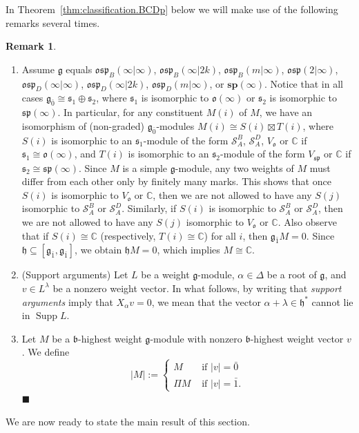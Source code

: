 \documentclass[12pt]{amsart}
\newcommand\C{\mathbb{C}}
\newcommand\g{\mathfrak{g}}
\newcommand\fs{\mathfrak{s}}
\newcommand\fh{\mathfrak{h}}
\newcommand\fb{\mathfrak{b}}
\newcommand\fsp{\mathfrak{sp}}
\newcommand\fosp{\mathfrak{osp}}
\newcommand\fo{\mathfrak{o}}
\newcommand\D{\Delta}
\newcommand\cS{\mathcal{S}}
\newcommand\bsp{\mathbf{sp}}
\DeclareMathOperator{\Supp}{Supp} %
\theoremstyle{plain}
\theoremstyle{definition}
\newtheorem{rem}[theo]{Remark}
\numberwithin{equation}{section}
\newcommand\xqed[1]{%
  \leavevmode\unskip\penalty9999 \hbox{}\nobreak\hfill
  \quad\hbox{#1}}
\newcommand\demo{\xqed{$\blacksquare$}}
\begin{document}
In Theorem~\ref{thm:classification.BCDp} below we will make use of the following remarks several times.

\begin{rem}\label{rem:supp.arguments}
\begin{enumerate}
\item Assume $\g$ equals $\fosp_B(\infty|\infty)$, $\fosp_B(\infty|2k)$, $\fosp_B(m|\infty)$, $\fosp(2|\infty)$, $\fosp_D(\infty|\infty)$, $\fosp_D(\infty|2k)$, $\fosp_D(m|\infty)$, or $\bsp(\infty)$. Notice that in all cases $\g_{\bar 0}\cong \fs_1\oplus \fs_2$, where $\fs_1$ is isomorphic to $\fo(\infty)$ or $\fs_2$ is isomorphic to $\fsp(\infty)$. In particular, for any constituent $M(i)$ of $M$, we have an isomorphism of (non-graded) $\g_{\bar 0}$-modules $M(i)\cong S(i)\boxtimes T(i)$, where $S(i)$ is isomorphic to an $\fs_1$-module of the form $\cS_A^B$, $\cS_A^D$, $V_\fo$ or $\C$ if $\fs_1\cong \fo(\infty)$, and $T(i)$ is isomorphic to an $\fs_2$-module of the form $V_\fsp$ or $\C$ if $\fs_2\cong \fsp(\infty)$. Since $M$ is a simple $\g$-module, any two weights of $M$ must differ from each other only by finitely many marks. This shows that once $S(i)$ is isomorphic to $V_\fo$ or $\C$, then we are not allowed to have any $S(j)$ isomorphic to $\cS_A^B$ or $\cS_A^D$. Similarly, if $S(i)$ is isomorphic to $\cS_A^B$ or $\cS_A^D$, then we are not allowed to have any $S(j)$ isomorphic to $V_\fo$ or $\C$. Also observe that if $S(i)\cong \C$ (respectively, $T(i)\cong \C$) for all $i$, then $\g_{\bar 1}M=0$. Since $\fh\subseteq [\g_{\bar 1}, \g_{\bar 1}]$, we obtain $\fh M=0$, which implies $M\cong \C$.
\item (Support arguments) Let $L$ be a weight $\g$-module, $\alpha\in \D$ be a root of $\g$, and $v\in L^\lambda$ be a nonzero weight vector. In what follows, by writing that \emph{support arguments} imply that $X_\alpha v = 0$, we mean that the vector $\alpha + \lambda\in \fh^*$ cannot lie in $\Supp L$.
\item Let $M$ be a $\fb$-highest weight $\g$-module with nonzero $\fb$-highest weight vector $v$. We define
	\[ 
|M| := \begin{cases} 
	M & \text{ if } |v| = {\bar 0} \\
	\Pi M  & \text{ if } |v|={\bar 1}.
  \end{cases}
	\]
\demo
\end{enumerate}
\end{rem}

We are now ready to state the main result of this section.
\end{document}
